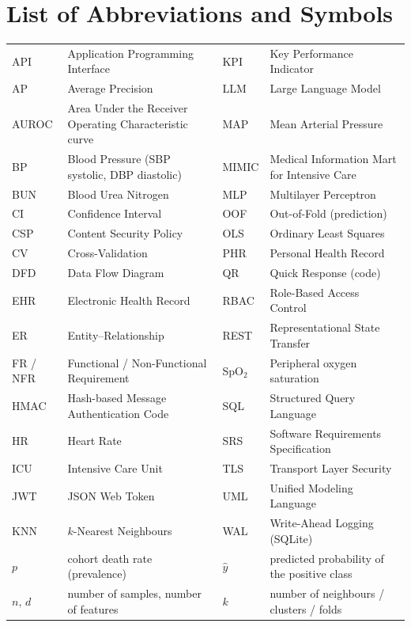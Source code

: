 \chapter*{List of Abbreviations and Symbols}
\begin{small}
\begin{tabularx}{\textwidth}{@{}lY@{\hspace{1.2em}}lY@{}}
\toprule
API & Application Programming Interface & KPI & Key Performance Indicator\\
AP & Average Precision & LLM & Large Language Model\\
AUROC & Area Under the Receiver Operating Characteristic curve & MAP & Mean Arterial Pressure\\
BP & Blood Pressure (SBP systolic, DBP diastolic) & MIMIC & Medical Information Mart for Intensive Care\\
BUN & Blood Urea Nitrogen & MLP & Multilayer Perceptron\\
CI & Confidence Interval & OOF & Out-of-Fold (prediction)\\
CSP & Content Security Policy & OLS & Ordinary Least Squares\\
CV & Cross-Validation & PHR & Personal Health Record\\
DFD & Data Flow Diagram & QR & Quick Response (code)\\
EHR & Electronic Health Record & RBAC & Role-Based Access Control\\
ER & Entity--Relationship & REST & Representational State Transfer\\
FR / NFR & Functional / Non-Functional Requirement & SpO$_2$ & Peripheral oxygen saturation\\
HMAC & Hash-based Message Authentication Code & SQL & Structured Query Language\\
HR & Heart Rate & SRS & Software Requirements Specification\\
ICU & Intensive Care Unit & TLS & Transport Layer Security\\
JWT & JSON Web Token & UML & Unified Modeling Language\\
KNN & $k$-Nearest Neighbours & WAL & Write-Ahead Logging (SQLite)\\
\midrule
$p$ & cohort death rate (prevalence) & $\hat{y}$ & predicted probability of the positive class\\
$n,\,d$ & number of samples, number of features & $k$ & number of neighbours / clusters / folds\\
\bottomrule
\end{tabularx}
\end{small}
